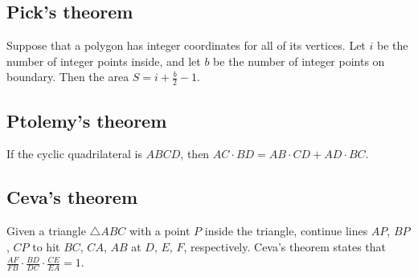 \hfill
{}

\subsection{Pick's theorem}
Suppose that a polygon has integer coordinates for all of its vertices. 
Let $i$ be the number of integer points inside, and let $b$ be the number of integer points on boundary. 
Then the area $S = i + \tfrac{b}{2} - 1$.

\subsection{Ptolemy's theorem}
If the cyclic quadrilateral is $ABCD$, then
$AC \cdot BD = AB \cdot CD + AD \cdot BC$.

\subsection{Ceva's theorem}
Given a triangle $\triangle ABC$ with a point $P$ inside the triangle,
continue lines $AP$, $BP$, $CP$ to hit $BC$, $CA$, $AB$ at $D$, $E$, $F$,
respectively.
Ceva's theorem states that
$\frac{AF}{FB} \cdot \frac{BD}{DC} \cdot \frac{CE}{EA} = 1$. 

